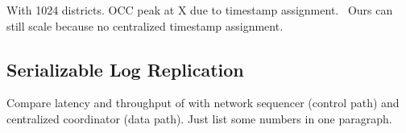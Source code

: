 With 1024 districts.
OCC peak at X due to timestamp assignment.~\cite{yu2014staring} Ours can still scale because no centralized timestamp assignment.

\subsection{Serializable Log Replication}
\label{subsec:eval-replication}

Compare latency and throughput of \sys with network sequencer (control path) and centralized coordinator (data path).
Just list some numbers in one paragraph.







